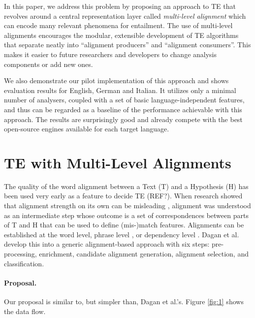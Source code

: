 \documentclass[11pt,letterpaper]{article}
\begin{document}
In this paper, we address this problem by proposing an approach to TE
that revolves around a central representation layer called {\em
  multi-level alignment} which can encode many relevant phenomena for
entailment. The use of multi-level alignments encourages the modular,
extensible development of TE algorithms that separate neatly into
``alignment producers'' and ``alignment consumers''. This makes it
easier to future researchers and developers to change analysis
components or add new ones. 

We also demonstrate our pilot implementation of this approach and
shows evaluation results for English, German and Italian. It utilizes
only a minimal number of analysers, coupled with a set of basic
language-independent features, and thus can be regarded as a baseline
of the performance achievable with this approach.  The results are
surprisingly good and already compete with the best open-source
engines available for each target language.

\section{TE with Multi-Level Alignments}

The quality of the word alignment between a Text (T) and a Hypothesis
(H) has been used very early as a feature to decide TE (REF?). When
research showed that alignment strength on its own can be misleading
\cite{maccartney-EtAl:2006:HLT-NAACL06-Main}, alignment was
understood as an intermediate step whose outcome is a set of
correspondences between parts of T and H that can be used to define
(mis-)match features. Alignments can be established at the
word level, phrase level \cite{MacCartney:EMNLP08}, or dependency
level \cite{dinu-wang:2009:EACL}. Dagan et
al.  develop this into a
generic alignment-based approach with six steps: pre-processing,
enrichment, candidate alignment generation, alignment selection, and
classification.

\paragraph{Proposal.} Our proposal is similar to, but simpler than,
Dagan et al.'s. Figure \ref{fig:1} shows the data flow.
\end{document}
